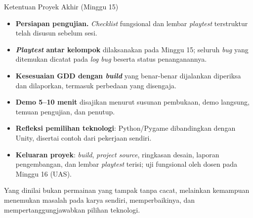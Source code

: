\documentclass[aspectratio=169,10pt]{beamer}
\begin{document}
\begin{frame}{Ketentuan Proyek Akhir (Minggu 15)}
\begin{itemize}
  \item \textbf{Persiapan pengujian.} \emph{Checklist} fungsional dan lembar
        \emph{playtest} terstruktur telah disusun sebelum sesi.
  \item \textbf{\emph{Playtest} antar kelompok} dilaksanakan pada Minggu 15;
        seluruh \emph{bug} yang ditemukan dicatat pada \emph{log bug} beserta
        status penanganannya.
  \item \textbf{Kesesuaian GDD dengan \emph{build}} yang benar-benar dijalankan
        diperiksa dan dilaporkan, termasuk perbedaan yang disengaja.
  \item \textbf{Demo 5--10 menit} disajikan menurut susunan pembukaan, demo
        langsung, temuan pengujian, dan penutup.
  \item \textbf{Refleksi pemilihan teknologi}: Python/Pygame dibandingkan
        dengan Unity, disertai contoh dari pekerjaan sendiri.
  \item \textbf{Keluaran proyek}: \emph{build}, \emph{project source}, ringkasan
        desain, laporan pengembangan, dan lembar \emph{playtest} terisi; uji
        fungsional oleh dosen pada Minggu 16 (UAS).
\end{itemize}
\vspace{0.12cm}
\begin{kotak}
Yang dinilai bukan permainan yang tampak tanpa cacat, melainkan kemampuan
menemukan masalah pada karya sendiri, memperbaikinya, dan
mempertanggungjawabkan pilihan teknologi.
\end{kotak}
\end{frame}
\end{document}
